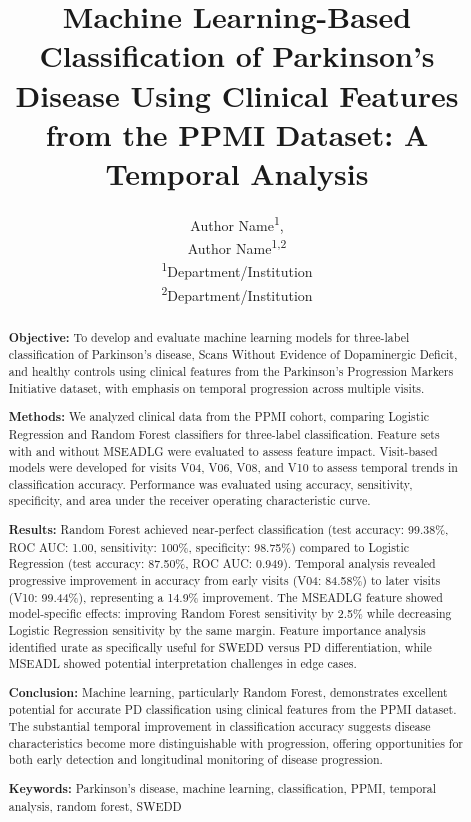 \documentclass[12pt,a4paper]{article}
\title{\textbf{Machine Learning-Based Classification of Parkinson's Disease Using Clinical Features from the PPMI Dataset: A Temporal Analysis}}
\author{
    Author Name\textsuperscript{1}, \\
    Author Name\textsuperscript{1,2}
    \\[1em]
    \small\textsuperscript{1}Department/Institution \\
    \small\textsuperscript{2}Department/Institution \\
}
\date{}
\begin{document}
\maketitle

\begin{abstract}
\textbf{Objective:}
To develop and evaluate machine learning models for three-label classification of Parkinson's disease, Scans Without Evidence of Dopaminergic Deficit, and healthy controls using clinical features from the Parkinson's Progression Markers Initiative dataset, with emphasis on temporal progression across multiple visits.

\textbf{Methods:}
We analyzed clinical data from the PPMI cohort, comparing Logistic Regression and Random Forest classifiers for three-label classification. Feature sets with and without MSEADLG were evaluated to assess feature impact. Visit-based models were developed for visits V04, V06, V08, and V10 to assess temporal trends in classification accuracy. Performance was evaluated using accuracy, sensitivity, specificity, and area under the receiver operating characteristic curve.

\textbf{Results:}
Random Forest achieved near-perfect classification (test accuracy: 99.38\%, ROC AUC: 1.00, sensitivity: 100\%, specificity: 98.75\%) compared to Logistic Regression (test accuracy: 87.50\%, ROC AUC: 0.949). Temporal analysis revealed progressive improvement in accuracy from early visits (V04: 84.58\%) to later visits (V10: 99.44\%), representing a 14.9\% improvement. The MSEADLG feature showed model-specific effects: improving Random Forest sensitivity by 2.5\% while decreasing Logistic Regression sensitivity by the same margin. Feature importance analysis identified urate as specifically useful for SWEDD versus PD differentiation, while MSEADL showed potential interpretation challenges in edge cases.

\textbf{Conclusion:}
Machine learning, particularly Random Forest, demonstrates excellent potential for accurate PD classification using clinical features from the PPMI dataset. The substantial temporal improvement in classification accuracy suggests disease characteristics become more distinguishable with progression, offering opportunities for both early detection and longitudinal monitoring of disease progression.

\noindent\textbf{Keywords:} Parkinson's disease, machine learning, classification, PPMI, temporal analysis, random forest, SWEDD
\end{abstract}
\end{document}
